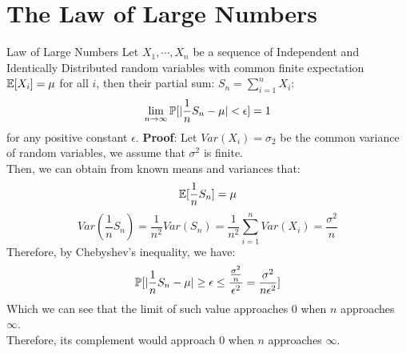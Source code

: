 \section{The Law of Large Numbers}
\begin{ln-theorem}{Law of Large Numbers}{}
    Let $X_1, \cdots, X_n$ be a sequence of Independent and Identically Distributed random variables with common finite expectation $\E[X_i] = \mu$ for all $i$, then their partial sum: $S_n = \sum_{i = 1}^n X_i$:
    \[
        \lim_{n \rightarrow \infty} \P[|\frac{1}{n} S_n - \mu| < \epsilon] = 1
    \]
    for any positive constant $\epsilon$.
    \tcblower
    \textbf{Proof}:
    Let $Var(X_i) = \sigma_2$ be the common variance of random variables, we assume that $\sigma^2$ is finite. \\
    Then, we can obtain from known means and variances that:
    \[
        \E[\frac{1}{n} S_n] = \mu
    \]
    \[
        Var(\frac{1}{n} S_n) = \frac{1}{n^2} Var(S_n) = \frac{1}{n^2} \sum_{i = 1}^n Var(X_i) = \frac{\sigma^2}{n}
    \]
    Therefore, by Chebyshev's inequality, we have:
    \[
        \P[|\frac{1}{n} S_n - \mu| \geq \epsilon \leq \frac{\frac{\sigma^2}{n}}{\epsilon^2} = \frac{\sigma^2}{n\epsilon^2}]
    \]
    Which we can see that the limit of such value approaches $0$ when $n$ approaches $\infty$. \\
    Therefore, its complement would approach $0$ when $n$ approaches $\infty$.
\end{ln-theorem}
